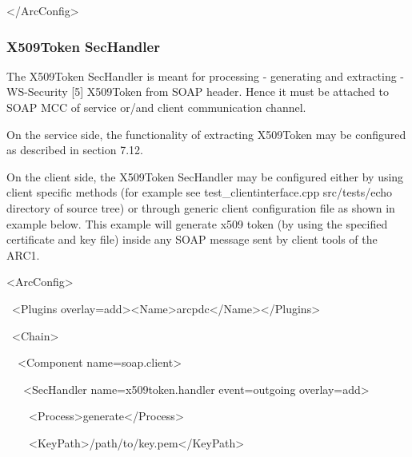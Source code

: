 \documentclass{article}
\begin{document}
{\ttfamily\color{black}
{\textless}/ArcConfig{\textgreater}}

\subsubsection[X509Token SecHandler]{X509Token SecHandler}
{\color{black}
The X509Token SecHandler is meant for processing - generating and
extracting - WS-Security [5] X509Token from SOAP header. Hence it must
be attached to SOAP MCC of service or/and client communication channel.
}

{\color{black}
On the service side, the functionality of extracting X509Token may be
configured as described in section 7.12. }

{\color{black}
On the client side, the X509Token SecHandler may be configured either by
using client specific methods (for example see
test\_clientinterface.cpp src/tests/echo directory of source tree) or
through generic client configuration file as shown in example below.
This example will generate x509 token (by using the specified
certificate and key file) inside any SOAP message sent by client tools
of the ARC1.}

{\ttfamily\color{black}
{\textless}ArcConfig{\textgreater}}

{\ttfamily\color{black}
\ {\textless}Plugins
overlay={\textquotedbl}add{\textquotedbl}{\textgreater}{\textless}Name{\textgreater}arcpdc{\textless}/Name{\textgreater}{\textless}/Plugins{\textgreater}}

{\ttfamily\color{black}
\ {\textless}Chain{\textgreater}}

{\ttfamily\color{black}
\ \ {\textless}Component
name={\textquotedbl}soap.client{\textquotedbl}{\textgreater}}

{\ttfamily\color{black}
\ \ \ {\textless}SecHandler
name={\textquotedbl}x509token.handler{\textquotedbl}
event={\textquotedbl}outgoing{\textquotedbl}
overlay={\textquotedbl}add{\textquotedbl}{\textgreater}}

{\ttfamily\color{black}
\ \ \ \ {\textless}Process{\textgreater}generate{\textless}/Process{\textgreater}}

{\ttfamily\color{black}
\ \ \ \ {\textless}KeyPath{\textgreater}/path/to/key.pem{\textless}/KeyPath{\textgreater}}
\end{document}

